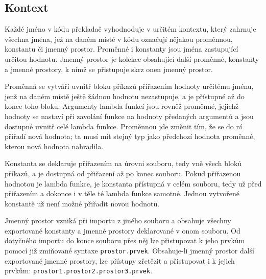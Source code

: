 \documentclass[a4paper,12pt]{article}
\begin{document}
\subsection{Kontext}
Každé jméno v kódu překladač vyhodnoduje v určitém kontextu, který zahrnuje všechna jména, jež na daném místě v kódu označují nějakou proměnnou, konstantu či jmenný prostor. Proměnné i konstanty jsou jména zastupující určitou hodnotu. Jmenný prostor je kolekce obsahující další proměnné, konstanty a jmenné prostory, k nimž se přistupuje skrz onen jmenný prostor.

Proměnná se vytváří uvnitř bloku příkazů přiřazením hodnoty určitému jménu, jenž na daném místě ještě žádnou hodnotu nezastupuje, a je přístupné až do konce toho bloku. Argumenty lambda funkcí jsou rovněž proměnné, jejichž hodnoty se nastaví při zavolání funkce na hodnoty předaných argumentů a jsou dostupné uvnitř celé lambda funkce. Proměnnou jde změnit tím, že se do ní přiřadí nová hodnota; ta musí mít stejný typ jako předchozí hodnota proměnné, kterou nová hodnota nahradila.

Konstanta se deklaruje přiřazením na úrovni souboru, tedy vně všech bloků příkazů, a je dostupná od přiřazení až po konec souboru. Pokud přiřazenou hodnotou je lambda funkce, je konstanta přístupná v celém souboru, tedy už před přiřazením a dokonce i v těle té lambda funkce samotné. Jednou vytvořené konstantě už není možné přiřadit novou hodnotu.

Jmenný prostor vzniká při importu z jiného souboru a obsahuje všechny exportované konstanty a jmenné prostory deklarované v onom souboru. Od dotyčného importu do konce souboru přes něj lze přistupovat k jeho prvkům pomocí již zmiňované syntaxe \texttt{prostor.prvek}. Obsahuje-li jmenný prostor další exportované jmenné prostory, lze přístupy zřetězit a přistupovat i k jejich prvkům: \texttt{prostor1.prostor2.prostor3.prvek}.
\end{document}
